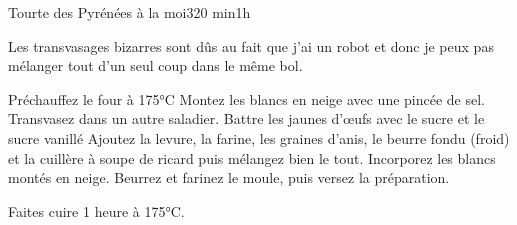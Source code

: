 {\begin{recette}{Tourte des Pyrénées à la moi}{3}{20 min}{1h}
\begin{remarque}
Les transvasages bizarres sont dûs au fait que j'ai un robot et donc je peux pas mélanger tout d'un seul coup dans le même bol.
\end{remarque}


\begin{preparation}
\etape Préchauffez le four à 175°C
\etape Montez les blancs en neige avec une pincée de sel. Transvasez dans un autre saladier.
\etape Battre les jaunes d'œufs avec le sucre et le sucre vanillé
\etape Ajoutez la levure, la farine, les graines d'anis, le beurre fondu (froid) et la cuillère à soupe de ricard puis mélangez bien le tout.
\etape Incorporez les blancs montés en neige.
\etape Beurrez et farinez le moule, puis versez la préparation.
\end{preparation}

\begin{cuisson}
Faites cuire 1 heure à 175°C.
\end{cuisson}
\end{recette}


}%
